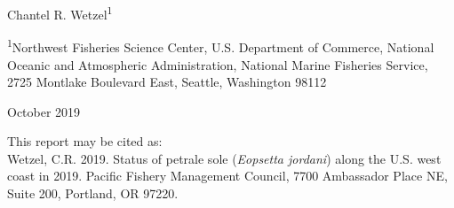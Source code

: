 
\begin{center}
\thispagestyle{empty}


\vspace{.5cm}




Chantel R. Wetzel\textsuperscript{1}\\


\vspace{.5cm}

\small
\textsuperscript{1}Northwest Fisheries Science Center, U.S. Department of Commerce, National Oceanic and Atmospheric Administration, National Marine Fisheries Service, 2725 Montlake Boulevard East, Seattle, Washington 98112\\

\vspace{.3cm}





\vspace{1cm}

\vfill
October 2019

\vspace{1cm}



\vspace{.3cm}

\newpage

\vspace{3cm}

This report may be cited as:\\

Wetzel, C.R. 2019. Status of petrale sole (\textit{Eopsetta jordani}) along the U.S. west coast in 2019. Pacific Fishery Management Council, 7700 Ambassador Place NE, Suite 200, Portland, OR 97220. 
\end{center}

\vspace{3cm}



\maketitle


\setcounter{page}{1}



